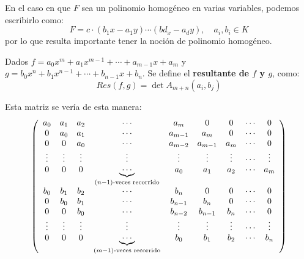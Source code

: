 \documentclass[12pt]{report}
\theoremstyle{largebreak}
\begin{document}
    \begin{obs}
        En el caso en que $F$ sea un polinomio homogéneo en varias variables, podemos escribirlo como:
        \begin{equation*}
            F=c\cdot( b_1x-a_1y)\cdots( bd_x-a_dy),\quad a_i,b_i\in K
        \end{equation*}
        por lo que resulta importante tener la noción de polinomio homogéneo.
    \end{obs}

    \begin{mydef}
        Dados $f=a_0x^m+a_1x^{ m-1}+\cdots+a_{ m-1}x+a_m$ y $g=b_0x^n+b_1x^{ n-1}+\cdots+b_{ n-1}x+b_n$. Se define el \textbf{resultante de $f$ y $g$}, como:
        \begin{equation*}
            Res(f,g)=\det A_{ m+n}(a_i,b_j)
        \end{equation*}
    \end{mydef}

    Esta matriz se vería de esta manera:
    \begin{equation*}
        \left(
            \begin{array}{cccccccccc}
                a_0 & a_1 & a_2 & \cdots & a_m & 0 & 0 & \cdots & 0 \\
                0 & a_0 & a_1 &  \cdots & a_{ m-1} & a_m & 0 & \cdots & 0 \\
                0 & 0 & a_0 & \cdots & a_{ m-2} & a_{ m-1} & a_m & \cdots & 0 \\
                \vdots & \vdots & \vdots & \vdots  & \vdots & \vdots & \vdots & \cdots & \vdots \\
                0 & 0 & 0 &  \underset{(n-1)\textup{-veces recorrido}}{\underbrace{\cdots}} & a_0 & a_1 & a_2 & \cdots & a_m \\
                b_0 & b_1 & b_2 & \cdots & b_n & 0 & 0 & \cdots & 0 \\
                0 & b_0 & b_1 &  \cdots & b_{ n-1} & b_n & 0 & \cdots & 0 \\
                0 & 0 & b_0 & \cdots & b_{ n-2} & b_{ n-1} & b_n& \cdots & 0 \\
                \vdots & \vdots & \vdots & \vdots  & \vdots & \vdots & \vdots & \cdots & \vdots \\
                0 & 0 & 0 &  \underset{(m-1)\textup{-veces recorrido}}{\underbrace{\cdots}} & b_0 & b_1 & b_2 & \cdots & b_n \\
            \end{array}
            \right)
    \end{equation*}
\end{document}
